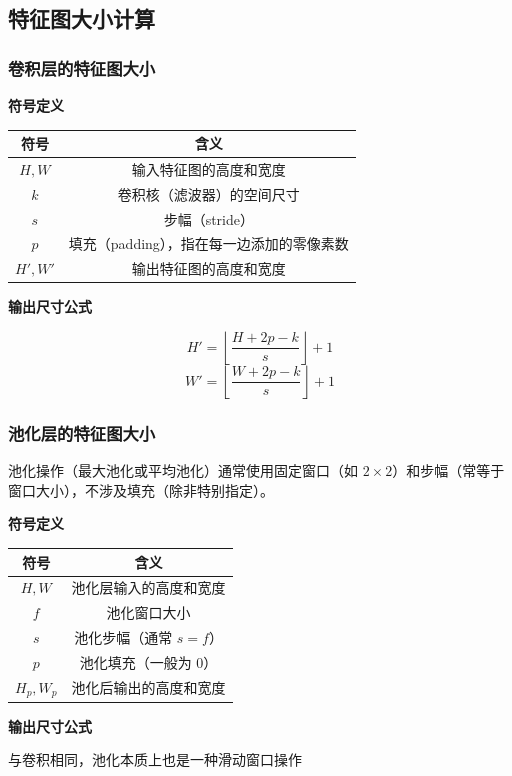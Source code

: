 \documentclass[12pt]{article}
\begin{document}
\subsection{特征图大小计算}
\subsubsection{卷积层的特征图大小}
\textbf{符号定义}
\begin{center}
\begin{tabular}{c|c}
\hline
符号 & 含义 \\
\hline
$ H, W $ & 输入特征图的高度和宽度 \\
$ k $ & 卷积核（滤波器）的空间尺寸 \\
$ s $ & 步幅（stride） \\
$ p $ & 填充（padding），指在每一边添加的零像素数 \\
$ H', W' $ & 输出特征图的高度和宽度 \\
\hline
\end{tabular}
\end{center}

\textbf{输出尺寸公式}

$$
H' = \left\lfloor \frac{H + 2p - k}{s} \right\rfloor + 1
$$
$$
W' = \left\lfloor \frac{W + 2p - k}{s} \right\rfloor + 1
$$

\subsubsection{池化层的特征图大小}
池化操作（最大池化或平均池化）通常使用固定窗口（如 $2\times2$）和步幅（常等于窗口大小），不涉及填充（除非特别指定）。

\textbf{符号定义}

\begin{center}
\begin{tabular}{c|c}
\hline
符号 & 含义 \\
\hline
$ H, W $ & 池化层输入的高度和宽度 \\
$ f $ & 池化窗口大小\\
$ s $ & 池化步幅（通常 $s = f$） \\
$ p $ & 池化填充（一般为 0） \\
$ H_p, W_p $ & 池化后输出的高度和宽度 \\
\hline
\end{tabular}
\end{center}

\textbf{输出尺寸公式}

与卷积相同，池化本质上也是一种滑动窗口操作
\end{document}
